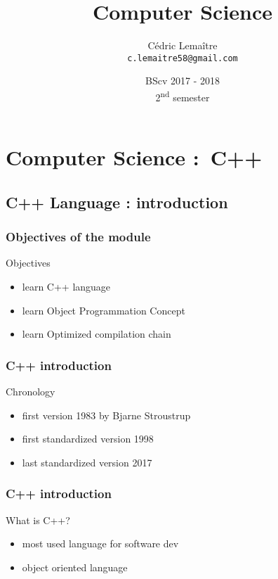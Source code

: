 \documentclass{beamer}
\title{Computer Science}
\author{Cédric Lemaître \\ \texttt{c.lemaitre58@gmail.com}}
\date{BScv 2017 - 2018 \\ 2\textsuperscript{nd} semester}
\institute{Universit\'e de Bourgogne}
\begin{document}
\begin{frame}
  \titlepage
\end{frame}

\begin{frame}
  \tableofcontents[sectionstyle=show,subsectionstyle=show,subsubsectionstyle=hide]
\end{frame}

\section{Computer Science : C++}

\subsection{C++ Language : introduction}

\begin{frame}
  \frametitle{Objectives of the module}
  \begin{block}{Objectives}
    \begin{itemize}
	\item learn C++ language
	\item learn Object Programmation Concept
	\item learn Optimized compilation chain
    \end{itemize}
  \end{block}
\end{frame}


\begin{frame}
  \frametitle{C++ introduction}
  \begin{block}{Chronology}
    \begin{itemize}
	\item first version 1983 by Bjarne Stroustrup
	\item first standardized version 1998
	\item last standardized version 2017
    \end{itemize}
  \end{block}
\end{frame}

\begin{frame}
  \frametitle{C++ introduction}
  \begin{block}{What is C++?}
    \begin{itemize}
	\item most used language for software dev
	\item object oriented language
    \end{itemize}
  \end{block}
\end{frame}
\end{document}
